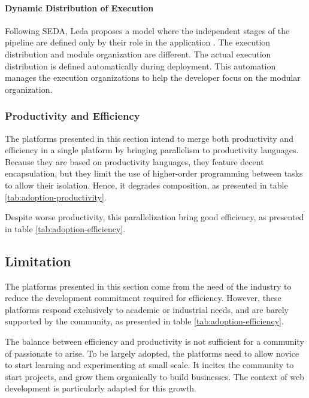 \paragraph{Dynamic Distribution of Execution}

Following SEDA, Leda proposes a model where the independent stages of the pipeline are defined only by their role in the application \cite{Salmito2013,Salmito2014}.
The execution distribution and module organization are different.
The actual execution distribution is defined automatically during deployment.
This automation manages the execution organizations to help the developer focus on the modular organization.

\subsubsection{Productivity and Efficiency}

The platforms presented in this section intend to merge both productivity and efficiency in a single platform by bringing parallelism to productivity languages.
Because they are based on productivity languages, they feature decent encapsulation, but they limit the use of higher-order programming between tasks to allow their isolation.
Hence, it degrades composition, as presented in table \ref{tab:adoption-productivity}.

Despite worse productivity, this parallelization bring good efficiency, as presented in table \ref{tab:adoption-efficiency}.


\subsection{Limitation}

The platforms presented in this section come from the need of the industry to reduce the development commitment required for efficiency.
However, these platforms respond exclusively to academic or industrial needs, and are barely supported by the community, as presented in table \ref{tab:adoption-efficiency}.

The balance between efficiency and productivity is not sufficient for a community of passionate to arise.
To be largely adopted, the platforms need to allow novice to start learning and experimenting at small scale.
It incites the community to start projects, and grow them organically to build businesses.
The context of web development is particularly adapted for this growth.

